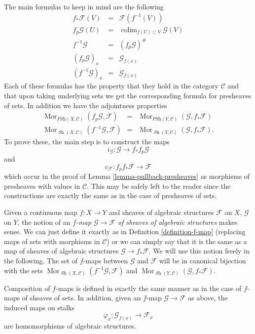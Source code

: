 \documentclass{stacks-project}
\theoremstyle{plain}
\theoremstyle{definition}
\theoremstyle{remark}
\numberwithin{equation}{subsection}
\def\colim{\mathop{\mathrm{colim}}\nolimits}
\def\Mor{\mathop{\mathrm{Mor}}\nolimits}
\def\Sh{\mathop{\mathit{Sh}}\nolimits}
\begin{document}
\medskip\noindent
The main formulas to keep in mind are the following
\begin{eqnarray*}
f_*\mathcal{F}(V) & = & \mathcal{F}(f^{-1}(V)) \\
f_p\mathcal{G}(U) & = & \colim_{f(U) \subset V} \mathcal{G}(V) \\
f^{-1}\mathcal{G} & = & (f_p\mathcal{G})^\# \\
(f_p\mathcal{G})_x & = & \mathcal{G}_{f(x)} \\
(f^{-1}\mathcal{G})_x & = & \mathcal{G}_{f(x)}
\end{eqnarray*}
Each of these formulas has the property that they hold in the
category $\mathcal{C}$ and that upon taking underlying
sets we get the corresponding formula for presheaves of sets.
In addition we have the adjointness properties
\begin{eqnarray*}
\Mor_{\textit{PSh}(X, \mathcal{C})}(f_p\mathcal{G}, \mathcal{F})
& = &
\Mor_{\textit{PSh}(Y, \mathcal{C})}(\mathcal{G}, f_*\mathcal{F}) \\
\Mor_{\Sh(X, \mathcal{C})}(f^{-1}\mathcal{G}, \mathcal{F})
& = &
\Mor_{\Sh(Y, \mathcal{C})}(\mathcal{G}, f_*\mathcal{F}).
\end{eqnarray*}
To prove these, the main step is to construct the maps
$$
i_\mathcal{G} : \mathcal{G} \longrightarrow f_*f_p\mathcal{G}
$$
and
$$
c_\mathcal{F} : f_p f_* \mathcal{F} \longrightarrow \mathcal{F}
$$
which occur in the proof of Lemma \ref{lemma-pullback-presheaves} as
morphisms of presheaves with values in $\mathcal{C}$. This may be safely
left to the reader since the constructions are exactly the same
as in the case of presheaves of sets.

\medskip\noindent
Given a continuous map $f : X \to Y$ and sheaves of algebraic
structures $\mathcal{F}$ on $X$, $\mathcal{G}$ on $Y$, the notion
of an {\it $f$-map $\mathcal{G} \to \mathcal{F}$
of sheaves of algebraic structures} makes sense. We can just define
it exactly as in Definition \ref{definition-f-map} (replacing maps
of sets with morphisms in $\mathcal{C}$) or we can
simply say that it is the same as a map of sheaves of algebraic
structures $\mathcal{G} \to f_*\mathcal{F}$. We will use this
notion freely in the following. The set of $f$-maps between
$\mathcal{G}$ and $\mathcal{F}$ will be in canonical bijection
with the sets
$\Mor_{\Sh(X, \mathcal{C})}(f^{-1}\mathcal{G}, \mathcal{F})$
and
$\Mor_{\Sh(Y, \mathcal{C})}(\mathcal{G}, f_*\mathcal{F})$.

\medskip\noindent
Composition of $f$-maps is defined in exactly the
same manner as in the case of $f$-maps of sheaves of
sets. In addition, given an $f$-map $\mathcal{G} \to \mathcal{F}$
as above, the induced maps on stalks
$$
\varphi_x : \mathcal{G}_{f(x)} \longrightarrow \mathcal{F}_x
$$
are homomorphisms of algebraic structures.
\end{document}
